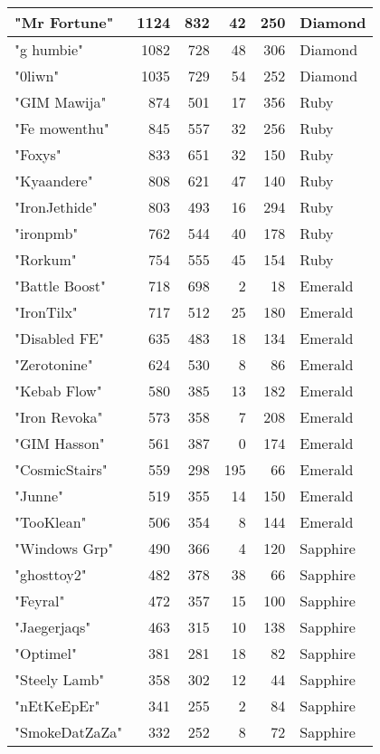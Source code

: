 \documentclass{article}
\begin{document}
\begin{table}[htbp]
\begin{tabular}{|l|r|r|r|r|l|}
"Mr Fortune" & 1124 & 832 & 42 & 250 & Diamond \\ \hline
"g humbie" & 1082 & 728 & 48 & 306 & Diamond \\ \hline
"0liwn" & 1035 & 729 & 54 & 252 & Diamond \\ \hline
"GIM Mawija" & 874 & 501 & 17 & 356 & Ruby \\ \hline
"Fe mowenthu" & 845 & 557 & 32 & 256 & Ruby \\ \hline
"Foxys" & 833 & 651 & 32 & 150 & Ruby \\ \hline
"Kyaandere" & 808 & 621 & 47 & 140 & Ruby \\ \hline
"IronJethide" & 803 & 493 & 16 & 294 & Ruby \\ \hline
"ironpmb" & 762 & 544 & 40 & 178 & Ruby \\ \hline
"Rorkum" & 754 & 555 & 45 & 154 & Ruby \\ \hline
"Battle Boost" & 718 & 698 & 2 & 18 & Emerald \\ \hline
"IronTilx" & 717 & 512 & 25 & 180 & Emerald \\ \hline
"Disabled FE" & 635 & 483 & 18 & 134 & Emerald \\ \hline
"Zerotonine" & 624 & 530 & 8 & 86 & Emerald \\ \hline
"Kebab Flow" & 580 & 385 & 13 & 182 & Emerald \\ \hline
"Iron Revoka" & 573 & 358 & 7 & 208 & Emerald \\ \hline
"GIM Hasson" & 561 & 387 & 0 & 174 & Emerald \\ \hline
"CosmicStairs" & 559 & 298 & 195 & 66 & Emerald \\ \hline
"Junne" & 519 & 355 & 14 & 150 & Emerald \\ \hline
"TooKlean" & 506 & 354 & 8 & 144 & Emerald \\ \hline
"Windows Grp" & 490 & 366 & 4 & 120 & Sapphire \\ \hline
"ghosttoy2" & 482 & 378 & 38 & 66 & Sapphire \\ \hline
"Feyral" & 472 & 357 & 15 & 100 & Sapphire \\ \hline
"Jaegerjaqs" & 463 & 315 & 10 & 138 & Sapphire \\ \hline
"Optimel" & 381 & 281 & 18 & 82 & Sapphire \\ \hline
"Steely Lamb" & 358 & 302 & 12 & 44 & Sapphire \\ \hline
"nEtKeEpEr" & 341 & 255 & 2 & 84 & Sapphire \\ \hline
"SmokeDatZaZa" & 332 & 252 & 8 & 72 & Sapphire \\ \hline

\end{tabular}
\end{table}
\end{document}
